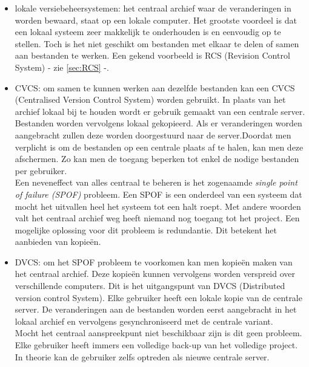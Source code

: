 \begin{itemize}
	\item lokale versiebeheersystemen: het centraal archief waar de veranderingen in worden bewaard, staat op een lokale computer. Het grootste voordeel is dat een lokaal systeem zeer makkelijk te onderhouden is en eenvoudig op te stellen. Toch is het niet geschikt om bestanden met elkaar te  delen of samen aan bestanden te werken. Een gekend voorbeeld is RCS (Revision Control System) - zie \ref{sec:RCS} -. \\
	
	\item CVCS: om samen te kunnen werken aan dezelfde bestanden kan een CVCS (Centralised Version Control System) worden gebruikt. In plaats van het archief lokaal bij te houden wordt er gebruik gemaakt van een centrale server. Bestanden worden vervolgens lokaal gekopieerd. Als er veranderingen worden aangebracht zullen deze worden doorgestuurd naar de server.Doordat men verplicht is om de bestanden op een centrale plaats af te halen, kan men deze afschermen. Zo kan men de toegang beperken tot enkel de nodige bestanden per gebruiker. \\
	
Een neveneffect van alles centraal te beheren is het zogenaamde \textit{single point of failure (SPOF)} probleem. Een SPOF is een onderdeel van een systeem dat mocht het uitvallen heel het systeem tot een halt roept. Met andere woorden valt het centraal archief weg heeft niemand nog toegang tot het project. Een mogelijke oplossing voor dit probleem is redundantie. Dit betekent het aanbieden van kopieën. \autocite{Sun2007}\\

	\item DVCS: om het SPOF probleem te voorkomen kan men kopieën maken van het centraal archief. Deze kopieën kunnen vervolgens worden verspreid over verschillende computers. Dit is het uitgangspunt van DVCS (Distributed version control System). Elke gebruiker heeft een lokale kopie van de centrale server. De veranderingen aan de bestanden worden eerst aangebracht in het lokaal archief en vervolgens gesynchroniseerd met de centrale variant.\\

Mocht het centraal aanspreekpunt niet beschikbaar zijn is dit geen probleem. Elke gebruiker heeft immers een volledige back-up van het volledige project. In theorie kan de gebruiker zelfs optreden als nieuwe centrale server.
\end{itemize}


